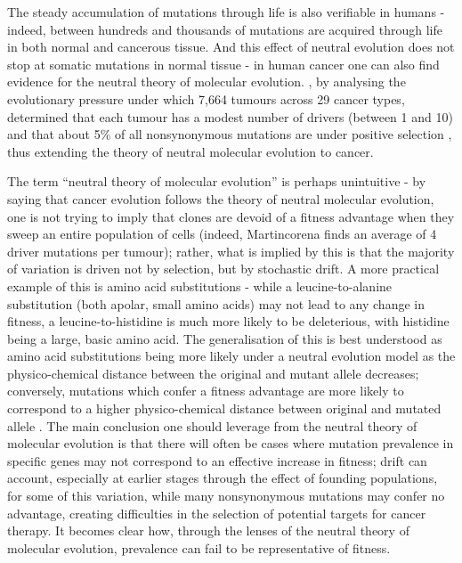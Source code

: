 The steady accumulation of mutations through life is also verifiable in humans \cite{Lee-Six2018-lp,Williams2020-ji,Yoshida2020-zi} - indeed, between hundreds and thousands of mutations are acquired through life in both normal and cancerous tissue. And this effect of neutral evolution does not stop at somatic mutations in normal tissue - in human cancer one can also find evidence for the neutral theory of molecular evolution. , by analysing the evolutionary pressure under which 7,664 tumours across 29 cancer types, determined that each tumour has a modest number of drivers (between 1 and 10) and that about 5\% of all nonsynonymous mutations are under positive selection \cite{Martincorena2017-ii}, thus extending the theory of neutral molecular evolution to cancer. 

The term “neutral theory of molecular evolution” is perhaps unintuitive - by saying that cancer evolution follows the theory of neutral molecular evolution, one is not trying to imply that clones are devoid of a fitness advantage when they sweep an entire population of cells (indeed, Martincorena finds an average of 4 driver mutations per tumour); rather, what is implied by this is that the majority of variation is driven not by selection, but by stochastic drift. A more practical example of this is amino acid substitutions - while a leucine-to-alanine substitution (both apolar, small amino acids) may not lead to any change in fitness, a leucine-to-histidine is much more likely to be deleterious, with histidine being a large, basic amino acid. The generalisation of this is best understood as amino acid substitutions being more likely under a neutral evolution model as the physico-chemical distance between the original and mutant allele decreases; conversely, mutations which confer a fitness advantage are more likely to correspond to a higher physico-chemical distance between original and mutated allele \cite{Kimura1979-ps}. The main conclusion one should leverage from the neutral theory of molecular evolution is that there will often be cases where mutation prevalence in specific genes may not correspond to an effective increase in fitness; drift can account, especially at earlier stages through the effect of founding populations, for some of this variation, while many nonsynonymous mutations may confer no advantage, creating difficulties in the selection of potential targets for cancer therapy. It becomes clear how, through the lenses of the neutral theory of molecular evolution, prevalence can fail to be representative of fitness.

